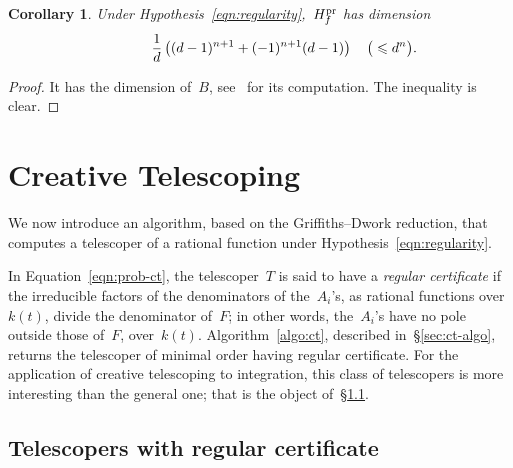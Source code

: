 \documentclass{sig-alternate}
\newtheorem{coro}[thm]{Corollary}
\newcommand{\pr}{{\smash{\mathrm{pr}}}}
\newcommand{\Hfp}{H_f^{\pr}}
\begin{document}
\begin{coro}\label{coro:hdim}
  Under Hypothesis~\eqref{eqn:regularity},~$\Hfp$ has dimension
  \[ \frac 1d \left((d-1)^{n+1}+(-1)^{n+1}(d-1)\right) \quad\mathrlap{\big( \leqslant d^n \big).} \]
\end{coro}

\begin{proof}
It has the dimension of~$B$, see~\cite[thm. 8.3]{Mon70} for its computation. The inequality is clear.
\end{proof}




\section{Creative Telescoping}

\noindent We now introduce an algorithm, based on the Griffiths--Dwork reduction, that computes a telescoper of a rational function under Hypothesis~\eqref{eqn:regularity}.

In Equation~\eqref{eqn:prob-ct}, the telescoper~$T$ is said to have a \emph{regular certificate} if the irreducible factors of the denominators of the~$A_i$'s, as rational functions over~$k(t)$, divide the denominator of~$F$; in other words, the~$A_i$'s have no pole outside those of~$F$, over~$k(t)$. 
Algorithm~\ref{algo:ct}, described in~\S\ref{sec:ct-algo}, returns the telescoper of minimal order having regular certificate.
For the application of creative telescoping to integration, this class of telescopers is more interesting than the general one; that is the object of~\S\ref{sec:regular-certificate}.

\subsection{Telescopers with regular certificate}\label{sec:regular-certificate}
\end{document}

